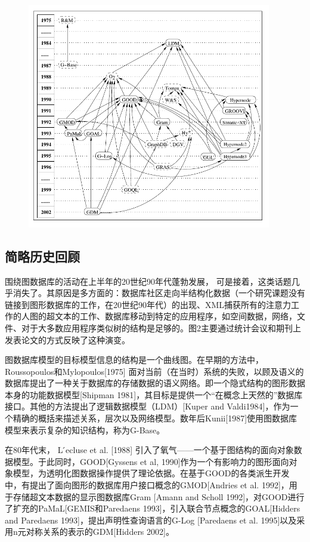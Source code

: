 \documentclass[a4paper]{ecust_thesis_translation}
\begin{document}
		\begin{center}
			\begin{figure}[!h]
				\centering
				\includegraphics[width=0.95\textwidth]{img/pic2.png}
			\end{figure}
		\end{center}

	\subsection{简略历史回顾}
		围绕图数据库的活动在上半年的20世纪90年代蓬勃发展， 可是接着，这类话题几乎消失了。其原因是多方面的：数据库社区走向半结构化数据（一个研究课题没有链接到图形数据库的工作，在20世纪90年代）的出现、XML捕获所有的注意力工作的人图的超文本的工作、数据库移动到特定的应用程序，如空间数据，网络，文件、对于大多数应用程序类似树的结构是足够的。图2主要通过统计会议和期刊上发表论文的方式反映了这种演变。
			
		图数据库模型的目标模型信息的结构是一个曲线图。在早期的方法中， Roussopoulos和Mylopoulos[1975] 面对当前（在当时）系统的失败，以顾及语义的数据库提出了一种关于数据库的存储数据的语义网络。即一个隐式结构的图形数据本身的功能数据模型[Shipman 1981]，其目标是提供一个“在概念上天然的”数据库接口。其他的方法提出了逻辑数据模型（LDM）[Kuper and Valdi1984]，作为一个精确的概括来描述关系，层次以及网络模型。数年后Kunii[1987]使用图数据库模型来表示复杂的知识结构，称为G-Base。

		在80年代末， L ́ecluse et al. [1988] 引入了氧气——一个基于图结构的面向对象数据模型。于此同时，GOOD[Gyssens et al, 1990]作为一个有影响力的图形面向对象模型，为透明化图数据操作提供了理论依据。在基于GOOD的各类派生开发中，有提出了面向图形的数据库用户接口概念的GMOD[Andries et al. 1992]，用于存储超文本数据的显示图数据库Gram [Amann and Scholl 1992]，对GOOD进行了扩充的PaMaL[GEMIS和Paredaens 1993]，引入联合节点概念的GOAL[Hidders and Paredaens 1993]，提出声明性查询语言的G-Log [Paredaens et al. 1995]以及采用n元对称关系的表示的GDM[Hidders 2002]。
\end{document}

